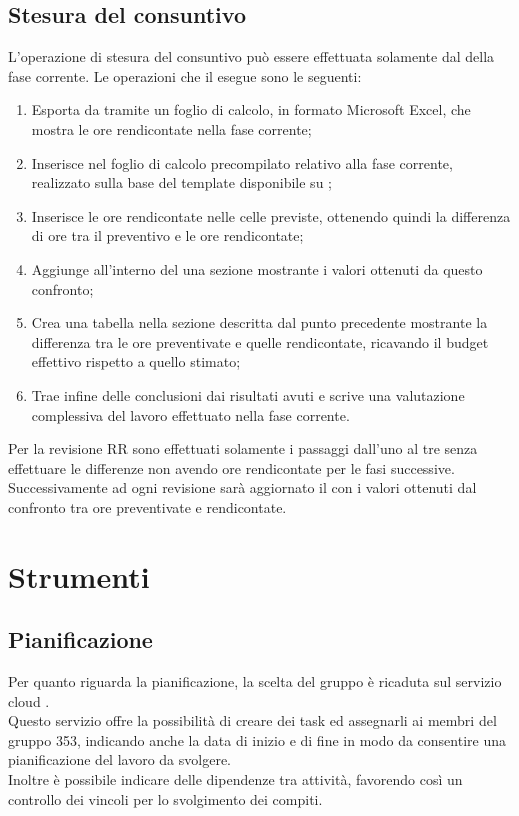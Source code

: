 \documentclass[NormeDiProgetto.tex]{subfiles}
\begin{document}
	\subsection{Stesura del consuntivo}
	L'operazione di stesura del consuntivo può essere effettuata solamente dal \respdiprog della fase corrente.
	Le operazioni che il \respdiprog esegue sono le seguenti:
	\begin{enumerate}
		\item Esporta da  tramite  un foglio di calcolo, in formato Microsoft Excel, che mostra le ore rendicontate nella fase corrente;
		\item Inserisce nel foglio di calcolo precompilato relativo alla fase corrente, realizzato sulla base del template disponibile su ;
		\item Inserisce le ore rendicontate nelle celle previste, ottenendo quindi la differenza di ore tra il preventivo e le ore rendicontate;
		\item Aggiunge all'interno del \pdp una sezione mostrante i valori ottenuti da questo confronto;
		\item Crea una tabella nella sezione descritta dal punto precedente mostrante la differenza tra le ore preventivate e quelle rendicontate, ricavando il budget effettivo rispetto a quello stimato;
		\item Trae infine delle conclusioni dai risultati avuti e scrive una valutazione complessiva del lavoro effettuato nella fase corrente.
	\end{enumerate}
	Per la revisione RR sono effettuati solamente i passaggi dall'uno al tre senza effettuare le differenze non avendo ore rendicontate per le fasi successive. Successivamente ad ogni revisione sarà aggiornato il \pdp con i valori ottenuti dal confronto tra ore preventivate e rendicontate. 
	
	\section{Strumenti}	
	\subsection{Pianificazione} Per quanto riguarda la pianificazione, la scelta del gruppo \gruppo è ricaduta sul servizio cloud .\\
	Questo servizio offre la possibilità di creare dei task ed assegnarli ai membri del gruppo 353, indicando anche la data di inizio e di fine in modo da consentire una pianificazione del lavoro da svolgere.\\
	Inoltre è possibile indicare delle dipendenze tra attività, favorendo così un controllo dei vincoli per lo svolgimento dei compiti.\\
	
\end{document}
